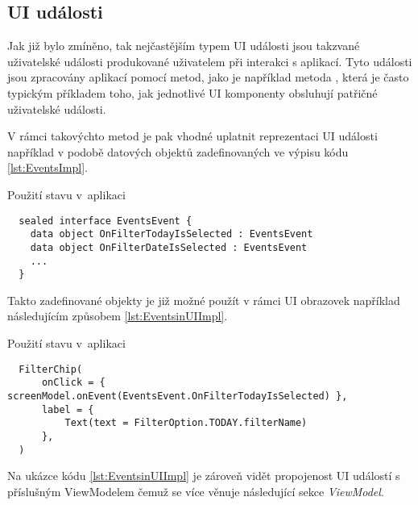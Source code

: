 \subsection{UI události} \label{eventHandlingImpl}

Jak již bylo zmíněno, tak nejčastějším typem UI události jsou takzvané uživatelské události produkované uživatelem při interakci s aplikací.
Tyto události jsou zpracovány aplikací pomocí metod, jako je například metoda , která je často typickým příkladem toho, jak
jednotlivé UI komponenty obsluhují patřičné uživatelské události. 

V rámci takovýchto metod je pak vhodné uplatnit reprezentaci UI události například v podobě datových objektů 
zadefinovaných ve výpisu kódu \ref{lst:EventsImpl}.

\begin{listing}[H]
\caption{Použití stavu v~aplikaci}\label{lst:EventsImpl}
\begin{verbatim}
  sealed interface EventsEvent {
    data object OnFilterTodayIsSelected : EventsEvent
    data object OnFilterDateIsSelected : EventsEvent
    ...
  }
\end{verbatim}
\end{listing}

Takto zadefinované objekty je již možné použít v rámci UI obrazovek například následujícím způsobem \ref{lst:EventsinUIImpl}.

\begin{listing}[H]
\caption{Použití stavu v~aplikaci}\label{lst:EventsinUIImpl}
\begin{verbatim}
  FilterChip(
      onClick = { screenModel.onEvent(EventsEvent.OnFilterTodayIsSelected) },
      label = {
          Text(text = FilterOption.TODAY.filterName)
      },
  )
\end{verbatim}
\end{listing}

Na ukázce kódu \ref{lst:EventsinUIImpl} je zároveň vidět propojenost UI událostí s příslušným ViewModelem čemuž se více věnuje následující
sekce \textit{ViewModel}.






